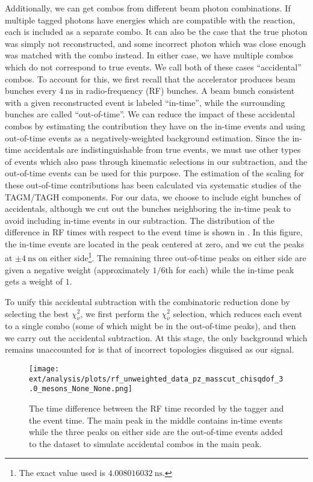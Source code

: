 Additionally, we can get combos from different beam photon combinations. If multiple tagged photons have energies which are compatible with the reaction, each is included as a separate combo. It can also be the case that the true photon was simply not reconstructed, and some incorrect photon which was close enough was matched with the combo instead. In either case, we have multiple combos which do not correspond to true events. We call both of these cases ``accidental'' combos. To account for this, we first recall that the accelerator produces beam bunches every $\SI{4}{\nano\second}$ in radio-frequency (RF) bunches. A beam bunch consistent with a given reconstructed event is labeled ``in-time'', while the surrounding bunches are called ``out-of-time''. We can reduce the impact of these accidental combos by estimating the contribution they have on the in-time events and using out-of-time events as a negatively-weighted background estimation. Since the in-time accidentals are indistinguishable from true events, we must use other types of events which also pass through kinematic selections in our subtraction, and the out-of-time events can be used for this purpose. The estimation of the scaling for these out-of-time contributions has been calculated via systematic studies of the TAGM/TAGH components. For our data, we choose to include eight bunches of accidentals, although we cut out the bunches neighboring the in-time peak to avoid including in-time events in our subtraction. The distribution of the difference in RF times with respect to the event time is shown in . In this figure, the in-time events are located in the peak centered at zero, and we cut the peaks at $\pm \SI{4}{\nano\second}$ on either side\footnote{The exact value used is $\SI{4.008016032}{\nano\second}$.}. The remaining three out-of-time peaks on either side are given a negative weight (approximately $1/6$th for each) while the in-time peak gets a weight of $1$.

To unify this accidental subtraction with the combinatoric reduction done by selecting the best $\chi^2_\nu$, we first perform the $\chi^2_\nu$ selection, which reduces each event to a single combo (some of which might be in the out-of-time peaks), and then we carry out the accidental subtraction. At this stage, the only background which remains unaccounted for is that of incorrect topologies disguised as our signal.

\begin{figure}
  \begin{center}
    \texttt{[image: ext/analysis/plots/rf\_unweighted\_data\_pz\_masscut\_chisqdof\_3.0\_mesons\_None\_None.png]}
  \end{center}
  \caption{The time difference between the RF time recorded by the tagger and the event time. The main peak in the middle contains in-time events while the three peaks on either side are the out-of-time events added to the dataset to simulate accidental combos in the main peak.}\label{fig:rf-unweighted-data-pz-masscut-chisqdof-3.0-mesons}
\end{figure}
